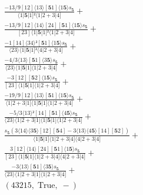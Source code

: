 \documentclass[varwidth, border=5pt]{standalone}
\begin{document}
\begin{my}
$\begin{gathered}
\scriptscriptstyle\frac{-13/9[12]⟨13⟩[𝟓1]⟨1𝟓⟩s_{𝟓}}{⟨1|𝟓|1]²⟨1|2+3|4]} +\\
\scriptscriptstyle\frac{-13/9[12]⟨14⟩[24][𝟓1]⟨1𝟓⟩s_{𝟓}}{[23]⟨1|𝟓|1]²⟨1|2+3|4]} +\\
\scriptscriptstyle\frac{-1[14]⟨34⟩²[𝟓1]⟨1𝟓⟩s_{𝟓}}{⟨23⟩⟨1|𝟓|1]²⟨4|2+3|4]} +\\
\scriptscriptstyle\frac{-4/3⟨13⟩[𝟓1]⟨3𝟓⟩s_{𝟓}}{⟨23⟩⟨1|𝟓|1]⟨1|2+3|4]} +\\
\scriptscriptstyle\frac{-3[12][𝟓2]⟨1𝟓⟩s_{𝟓}}{[23]⟨1|𝟓|1]⟨1|2+3|4]} +\\
\scriptscriptstyle\frac{-19/9[12]⟨13⟩[𝟓1]⟨1𝟓⟩s_{𝟓}}{⟨1|2+3|1]⟨1|𝟓|1]⟨1|2+3|4]} +\\
\scriptscriptstyle\frac{-5/3⟨13⟩²[14][𝟓1]⟨4𝟓⟩s_{𝟓}}{⟨23⟩⟨1|2+3|1]⟨1|𝟓|1]⟨1|2+3|4]} +\\
\scriptscriptstyle\frac{s_{𝟓}(3⟨14⟩⟨3𝟓⟩[12][𝟓4]-3⟨13⟩⟨4𝟓⟩[14][𝟓2])}{⟨1|𝟓|1]⟨1|2+3|4]⟨4|2+3|4]} +\\
\scriptscriptstyle\frac{3[12]⟨14⟩[24][𝟓1]⟨1𝟓⟩s_{𝟓}}{[23]⟨1|𝟓|1]⟨1|2+3|4]⟨4|2+3|4]} +\\
\scriptscriptstyle\frac{-3⟨13⟩[𝟓1]⟨3𝟓⟩s_{𝟓}}{⟨23⟩⟨1|2+3|1]⟨1|2+3|4]} +\\
\scriptscriptstyle(43215,\;\text{True},\;-) \phantom{+}
\end{gathered}$
\end{my}
\end{document}
